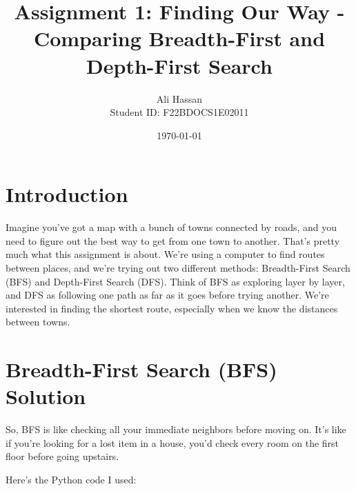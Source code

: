 \documentclass{article}
\title{Assignment 1: Finding Our Way - Comparing Breadth-First and Depth-First Search}
\author{Ali Hassan \\ Student ID: F22BDOCS1E02011}
\date{\today}
\begin{document}
\maketitle

\section{Introduction}

Imagine you've got a map with a bunch of towns connected by roads, and you need to figure out the best way to get from one town to another. That's pretty much what this assignment is about. We're using a computer to find routes between places, and we're trying out two different methods: Breadth-First Search (BFS) and Depth-First Search (DFS). Think of BFS as exploring layer by layer, and DFS as following one path as far as it goes before trying another. We’re interested in finding the shortest route, especially when we know the distances between towns.

\section{Breadth-First Search (BFS) Solution}

So, BFS is like checking all your immediate neighbors before moving on. It's like if you're looking for a lost item in a house, you'd check every room on the first floor before going upstairs.

Here's the Python code I used:
\end{document}
